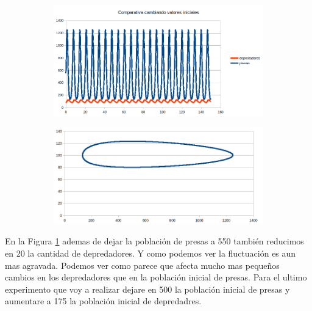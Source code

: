 \documentclass[12pt,a4paper]{article}
\begin{document}
\begin{figure}[H]
	\centering
	\begin{subfigure}{.5\textwidth}
		\centering
	\includegraphics[width=1\linewidth]{images/ejercicio2_3}
		\caption{}
	\label{fig:ejercicio231}
\end{subfigure}%
\begin{subfigure}{.5\textwidth}
		\centering
	\includegraphics[width=1\linewidth]{images/ejercicio2_3_2}
		\caption{}
	\label{fig:ejercicio232}
	\end{subfigure}

	\label{fig:ejercicio23}
\end{figure}
En la Figura \ref{fig:ejercicio231} ademas de dejar la población de presas a 550 también reducimos en 20 la cantidad de depredadores. Y como podemos ver la fluctuación es aun mas agravada. Podemos ver como parece que afecta mucho mas pequeños cambios en los depredadores que en la población inicial de presas. Para el ultimo experimento que voy a realizar dejare en 500 la población inicial de presas y aumentare a 175 la población inicial de depredadres. 
\end{document}
